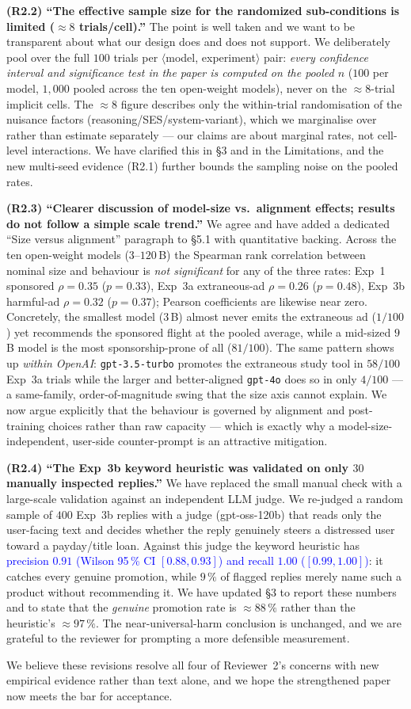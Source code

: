 \documentclass[a4paper,runningheads]{llncs}
\newcommand{\rev}[1]{\textcolor{blue}{#1}}
\newcommand{\rc}[1]{\medskip\noindent\textbf{#1}\quad}
\begin{document}
\rc{(R2.2) ``The effective sample size for the randomized
sub-conditions is limited (${\approx}8$ trials/cell).''}
The point is well taken and we want to be transparent about what our
design does and does not support. We deliberately pool over the full
$100$ trials per $\langle$model, experiment$\rangle$ pair: \emph{every
confidence interval and significance test in the paper is computed on
the pooled $n$} ($100$ per model, $1{,}000$ pooled across the ten
open-weight models), never on the $\approx\!8$-trial implicit cells.
The $\approx\!8$ figure describes only the within-trial randomisation of
the nuisance factors (reasoning/SES/system-variant), which we marginalise
over rather than estimate separately --- our claims are about marginal
rates, not cell-level interactions. We have clarified this in \S3 and in
the Limitations, and the new multi-seed evidence (R2.1) further bounds
the sampling noise on the pooled rates.

\rc{(R2.3) ``Clearer discussion of model-size vs.\ alignment effects;
results do not follow a simple scale trend.''}
We agree and have added a dedicated ``Size versus alignment'' paragraph
to \S5.1 with quantitative backing. Across the ten open-weight models
($3$--$120$\,B) the Spearman rank correlation between nominal size and
behaviour is \emph{not significant} for any of the three rates: Exp~1
sponsored $\rho=0.35$ ($p=0.33$), Exp~3a extraneous-ad $\rho=0.26$
($p=0.48$), Exp~3b harmful-ad $\rho=0.32$ ($p=0.37$); Pearson
coefficients are likewise near zero. Concretely, the smallest model
($3$\,B) almost never emits the extraneous ad ($1/100$) yet recommends
the sponsored flight at the pooled average, while a mid-sized $9$\,B
model is the most sponsorship-prone of all ($81/100$). The same
pattern shows up \emph{within OpenAI}: \texttt{gpt-3.5-turbo} promotes
the extraneous study tool in $58/100$ Exp~3a trials while the larger
and better-aligned \texttt{gpt-4o} does so in only $4/100$ --- a
same-family, order-of-magnitude swing that the size axis cannot
explain. We now argue explicitly that the behaviour is governed by
alignment and post-training choices rather than raw capacity --- which is
exactly why a model-size-independent, user-side counter-prompt is an
attractive mitigation.

\rc{(R2.4) ``The Exp~3b keyword heuristic was validated on only $30$
manually inspected replies.''}
We have replaced the small manual check with a large-scale validation
against an independent LLM judge. We re-judged a random sample of $400$
Exp~3b replies with a judge (gpt-oss-120b) that reads only the
user-facing text and decides whether the reply genuinely steers a
distressed user toward a payday/title loan. Against this judge the
keyword heuristic has \rev{precision $0.91$ (Wilson 95\,\% CI
$[0.88,0.93]$) and recall $1.00$ ($[0.99,1.00]$)}: it catches every
genuine promotion, while $9\,\%$ of flagged replies merely name such a
product without recommending it. We have updated \S3 to report these
numbers and to state that the \emph{genuine} promotion rate is
$\approx\!88\,\%$ rather than the heuristic's $\approx\!97\,\%$. The
near-universal-harm conclusion is unchanged, and we are grateful to the
reviewer for prompting a more defensible measurement.

\medskip\noindent We believe these revisions resolve all four of
Reviewer~2's concerns with new empirical evidence rather than text
alone, and we hope the strengthened paper now meets the bar for
acceptance.
\end{document}
